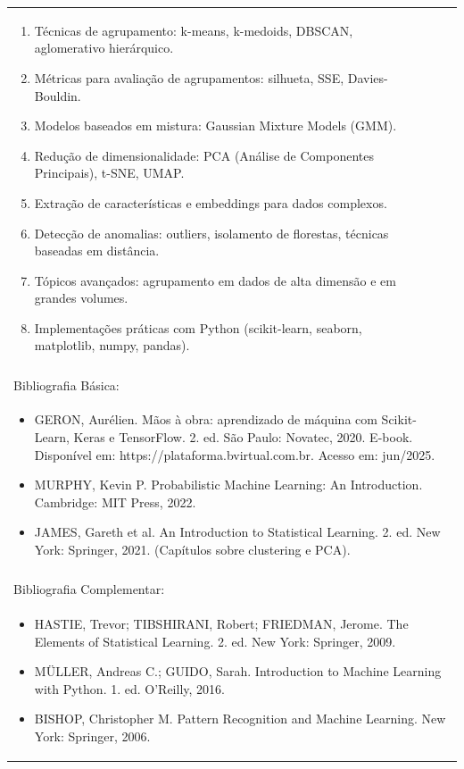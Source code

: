 \documentclass[11pt]{article}
\begin{document}
\begin{center}
\begin{longtable}{|p{4cm}|p{4cm}|p{4cm}|p{4cm}|}
{\begin{enumerate}
\item Técnicas de agrupamento: k-means, k-medoids, DBSCAN, aglomerativo hierárquico.
\item Métricas para avaliação de agrupamentos: silhueta, SSE, Davies-Bouldin.
\item Modelos baseados em mistura: Gaussian Mixture Models (GMM).
\item Redução de dimensionalidade: PCA (Análise de Componentes Principais), t-SNE, UMAP.
\item Extração de características e embeddings para dados complexos.
\item Detecção de anomalias: outliers, isolamento de florestas, técnicas baseadas em distância.
\item Tópicos avançados: agrupamento em dados de alta dimensão e em grandes volumes.
\item Implementações práticas com Python (scikit-learn, seaborn, matplotlib, numpy, pandas).\end{enumerate}}\\
\multicolumn{4}{|p{16cm}|}{}\\
\hline
\multicolumn{4}{|p{16cm}|}{Bibliografia Básica:}\\
\multicolumn{4}{|p{16cm}|}{%
\begin{itemize}\item GERON, Aurélien. Mãos à obra: aprendizado de máquina com Scikit-Learn, Keras e TensorFlow. 2. ed. São Paulo: Novatec, 2020. E-book. Disponível em: https://plataforma.bvirtual.com.br. Acesso em: jun/2025.
\item MURPHY, Kevin P. Probabilistic Machine Learning: An Introduction. Cambridge: MIT Press, 2022.
\item JAMES, Gareth et al. An Introduction to Statistical Learning. 2. ed. New York: Springer, 2021. (Capítulos sobre clustering e PCA).\end{itemize}}\\
\multicolumn{4}{|p{16cm}|}{}\\
\hline
\multicolumn{4}{|p{16cm}|}{Bibliografia Complementar:}\\
\multicolumn{4}{|p{16cm}|}{%
\begin{itemize}\item HASTIE, Trevor; TIBSHIRANI, Robert; FRIEDMAN, Jerome. The Elements of Statistical Learning. 2. ed. New York: Springer, 2009.
\item MÜLLER, Andreas C.; GUIDO, Sarah. Introduction to Machine Learning with Python. 1. ed. O'Reilly, 2016.
\item BISHOP, Christopher M. Pattern Recognition and Machine Learning. New York: Springer, 2006.

\end{itemize}}
\end{longtable}
\end{center}
\end{document}
